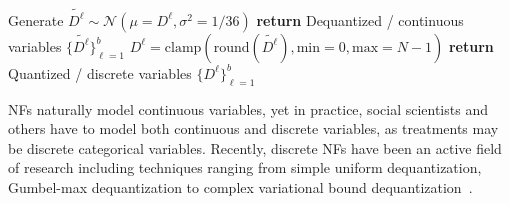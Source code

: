 \documentclass[letterpaper]{article} %
\begin{document}
\begin{algorithm}[tb!]
\caption{Gaussian Dequantization and Quantization}
\label{alg:dequatization quantization}
\begin{algorithmic}[1] %
\label{alg:dequatization}
\State Generate $\tilde{D^\ell} \sim \mathcal{N}(\mu={D}^{\ell},\sigma^2=1/36)$%
\State \textbf{return} Dequantized / continuous variables $\{\tilde{D^\ell}\}^b_{\ell{ = }1}$
\EndProcedure%
\label{alg:quatization}
\State ${D}^{\ell} = \mathrm{clamp}(\mathrm{round}(\tilde{D^\ell}), \mathrm{min}{ = }0, \mathrm{max}{ = }N{ - }1)$%
\State \textbf{return} Quantized / discrete variables $\{{D^\ell}\}^b_{\ell{ = }1}$
\EndProcedure%
\end{algorithmic}
\end{algorithm}
NFs naturally model continuous variables, yet  in practice, social scientists and others have to model both continuous and discrete variables, as treatments may be discrete categorical variables. 
Recently, discrete NFs have been an active field of research including techniques ranging from simple uniform dequantization, Gumbel-max dequantization to complex variational bound dequantization~\cite{Uria2013RNADETR_uniformdeq, Hoogeboom2019IDF, Tran2019IDF, ho2019flow++, ZieglerR2019VAE_dequant, Ma2019Macow, Nielsen2020DeqGap, Pawlowski2020DSCM_CI}.
\end{document}
